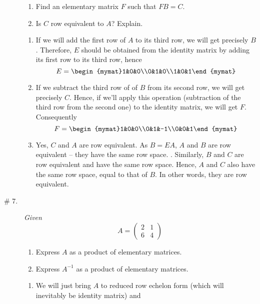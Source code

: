 \documentclass[8pt]{article} %
\begin{document}
\begin{description}
{{\begin{enumerate}[label=(\alph*)]
			\item Find an elementary matrix $F$ such that $FB=C$.
			\item Is $C$ row equivalent to $A$? Explain.
		\end{enumerate}
		}
		\begin{enumerate}[label=(\alph*)]
			\item If we will add the first row of $A$ to its third row, we will get precisely $B$. Therefore, $E$ should be obtained
				from the identity matrix by adding its first row to its third row, hence
				\[E=\begin{mymat}1&0&0\\0&1&0\\1&0&1\end{mymat}\]
			\item If we subtract the third row of of $B$ from its second row, we will get precisely $C$. Hence,
				if we'll apply this operation (subtraction of the third row from the second one) to the identity 
				matrix, we will get $F$. Consequently
				\[F=\begin{mymat}1&0&0\\0&1&-1\\0&0&1\end{mymat}\]
			\item Yes, $C$ and $A$ are row equivalent. As $B=EA$, $A$ and $B$ are row equivalent -- they have the same
				row space.
				. Similarly, $B$ and $C$
				are row equivalent and have the same row space. Hence, $A$ and $C$ also have the same row space,
				equal to that of $B$. In other words, they are row equivalent.
		\end{enumerate}
		}
	\item[\# 7.]{{\it Given \[A=\begin{pmatrix}2&1\\6&4\end{pmatrix}\]
			\begin{enumerate}[label=(\alph*)]
				\item Express $A$ as a product of elementary matrices.
				\item Express $A^{-1}$ as a product of elementary matrices.
			\end{enumerate}
		}
		\begin{enumerate}[label=(\alph*)]
		\newcommand{\mymat}[1]{\left(\begin{array}{rr}#1\end{array}\right)}
			\item We will just bring $A$ to reduced row echelon form (which will inevitably be identity matrix) and

\end{enumerate}}
\end{description}
\end{document}
